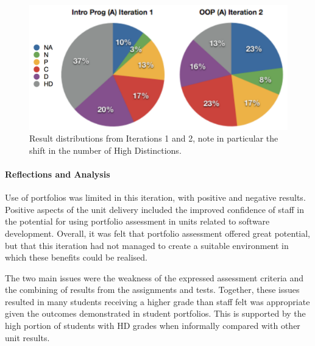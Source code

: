 \begin{figure}[p]
  \centering
  \includegraphics[width=0.8\columnwidth]{Iterations1_2}
  \caption{Result distributions from Iterations 1 and 2, note in particular the shift in the number of High Distinctions.}
  \label{fig:iterations_1_2}
\end{figure}

\paragraph{Reflections and Analysis} %
\label{ssub:analysis}

Use of portfolios was limited in this iteration, with positive and negative results. Positive aspects of the unit delivery included the improved confidence of staff in the potential for using portfolio assessment in units related to software development. Overall, it was felt that portfolio assessment offered great potential, but that this iteration had not managed to create a suitable environment in which these benefits could be realised.

The two main issues were the weakness of the expressed assessment criteria and the combining of results from the assignments and tests. Together, these issues resulted in many students receiving a higher grade than staff felt was appropriate given the outcomes demonstrated in student portfolios. This is supported by the high portion of students with HD grades when informally compared with other unit results.

